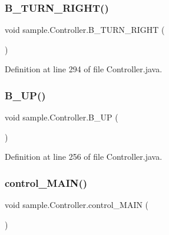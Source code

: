 \subsubsection{\texorpdfstring{B\+\_\+\+T\+U\+R\+N\+\_\+\+R\+I\+G\+H\+T()}{B\_TURN\_RIGHT()}}
{\footnotesize\ttfamily void sample.\+Controller.\+B\+\_\+\+T\+U\+R\+N\+\_\+\+R\+I\+G\+HT (\begin{DoxyParamCaption}{ }\end{DoxyParamCaption})\hspace{0.3cm}{\ttfamily [inline]}}



Definition at line 294 of file Controller.\+java.

\mbox{\label{classsample_1_1_controller_aa1573fe7c3d120ed37008ed70210a097}} 
\subsubsection{\texorpdfstring{B\+\_\+\+U\+P()}{B\_UP()}}
{\footnotesize\ttfamily void sample.\+Controller.\+B\+\_\+\+UP (\begin{DoxyParamCaption}{ }\end{DoxyParamCaption})\hspace{0.3cm}{\ttfamily [inline]}}



Definition at line 256 of file Controller.\+java.

\mbox{\label{classsample_1_1_controller_a7930a67c98018fc75fd8460b9591c48d}} 
\subsubsection{\texorpdfstring{control\+\_\+\+M\+A\+I\+N()}{control\_MAIN()}}
{\footnotesize\ttfamily void sample.\+Controller.\+control\+\_\+\+M\+A\+IN (\begin{DoxyParamCaption}{ }\end{DoxyParamCaption})\hspace{0.3cm}{\ttfamily [inline]}}



